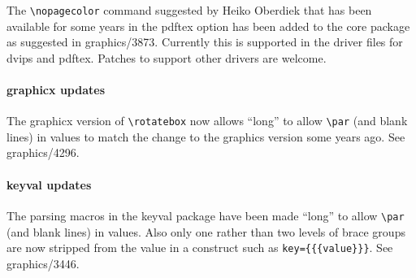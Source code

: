 \documentclass{ltnews}
\begin{document}
The \verb|\nopagecolor| command suggested by Heiko Oberdiek that has
been available for some years in the \textsf{pdftex} option has been
added to the core package as suggested in graphics/3873. Currently
this is supported in the driver files for \textsf{dvips} and
\textsf{pdftex}.  Patches to support other drivers are welcome.

 \paragraph{\textsf{graphicx} updates}

The \textsf{graphicx} version of \verb|\rotatebox| now allows ``long''
to allow \verb|\par| (and blank lines) in values to match the change
to the \textsf{graphics} version some years ago. See graphics/4296.

\paragraph{\textsf{keyval} updates}

The parsing macros in the \textsf{keyval} package have been made
``long'' to allow \verb|\par| (and blank lines) in values. Also only
one rather than two levels of brace groups are now stripped from the
value in a construct such as \verb|key={{{value}}}|. See
graphics/3446.
\end{document}
